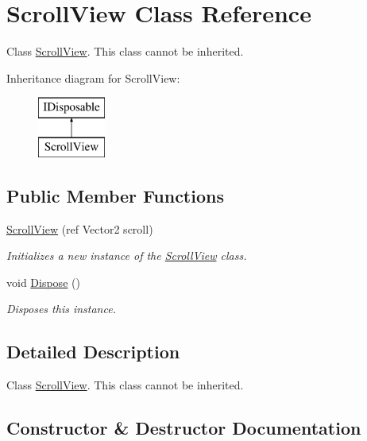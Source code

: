 \hypertarget{class_scroll_view}{}\section{Scroll\+View Class Reference}
\label{class_scroll_view}


Class \hyperlink{class_scroll_view}{Scroll\+View}. This class cannot be inherited.  


Inheritance diagram for Scroll\+View\+:\begin{figure}[H]
\begin{center}
\leavevmode
\includegraphics[height=2.000000cm]{class_scroll_view}
\end{center}
\end{figure}
\subsection*{Public Member Functions}
\begin{DoxyCompactItemize}
\item 
\hyperlink{class_scroll_view_ab2953e831d25c286008125c14cf3121b}{Scroll\+View} (ref Vector2 scroll)
\begin{DoxyCompactList}\small\item\em Initializes a new instance of the \hyperlink{class_scroll_view}{Scroll\+View} class. \end{DoxyCompactList}\item 
void \hyperlink{class_scroll_view_a297facb4dc5f6f2698415506b53d1b87}{Dispose} ()
\begin{DoxyCompactList}\small\item\em Disposes this instance. \end{DoxyCompactList}\end{DoxyCompactItemize}


\subsection{Detailed Description}
Class \hyperlink{class_scroll_view}{Scroll\+View}. This class cannot be inherited. 



\subsection{Constructor \& Destructor Documentation}
\mbox{\label{class_scroll_view_ab2953e831d25c286008125c14cf3121b}} 
